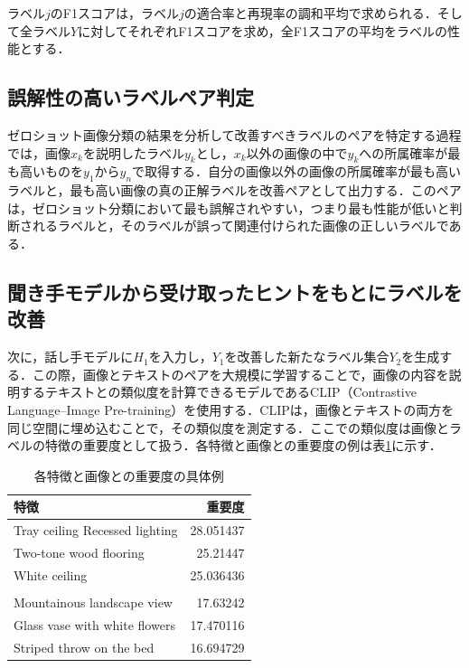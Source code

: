 \documentclass[a4paper,11pt]{jreport}
\begin{document}
ラベル$j$のF1スコアは，ラベル$j$の適合率と再現率の調和平均で求められる．そして全ラベル$Y$に対してそれぞれF1スコアを求め，全F1スコアの平均をラベルの性能とする．
\subsection{誤解性の高いラベルペア判定}
ゼロショット画像分類の結果を分析して改善すべきラベルのペアを特定する過程では，画像$x_k$を説明したラベル$y_k$とし，$x_k$以外の画像の中で$y_k$への所属確率が最も高いものを$y_1$から$y_n$で取得する．自分の画像以外の画像の所属確率が最も高いラベルと，最も高い画像の真の正解ラベルを改善ペアとして出力する．このペアは，ゼロショット分類において最も誤解されやすい，つまり最も性能が低いと判断されるラベルと，そのラベルが誤って関連付けられた画像の正しいラベルである．
\subsection{聞き手モデルから受け取ったヒントをもとにラベルを改善}
次に，話し手モデルに$H_1$を入力し，$Y_1$を改善した新たなラベル集合$Y_2$を生成する．この際，画像とテキストのペアを大規模に学習することで，画像の内容を説明するテキストとの類似度を計算できるモデルであるCLIP（Contrastive Language–Image Pre-training）を使用する．CLIPは，画像とテキストの両方を同じ空間に埋め込むことで，その類似度を測定する．ここでの類似度は画像とラベルの特徴の重要度として扱う．各特徴と画像との重要度の例は表\ref{tab:similarity_examples}に示す．

\begin{table}[ht]
\centering
\caption{各特徴と画像との重要度の具体例}
\label{tab:similarity_examples}
\begin{tabular}{@{}lr@{}}
\toprule
特徴 & 重要度 \\ \midrule
Tray ceiling Recessed lighting & 28.051437 \\
Two-tone wood flooring & 25.21447 \\
White ceiling & 25.036436 \\
\addlinespace %
\multicolumn{2}{c}{\dots} \\ %
\addlinespace %
Mountainous landscape view & 17.63242 \\
Glass vase with white flowers & 17.470116 \\
Striped throw on the bed & 16.694729 \\ \bottomrule
\end{tabular}
\end{table}
\end{document}
